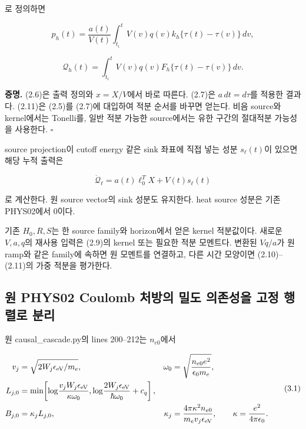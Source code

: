 \documentclass[11pt,a4paper]{article}
\begin{document}
로 정의하면

\[
p_h(t)=\frac{a(t)}{V(t)}
\int_{t_i}^{t}V(v)q(v)
k_h\{\tau(t)-\tau(v)\}\,dv,
\tag{2.10}
\]

\[
\boxed{
\mathcal Q_h(t)=
\int_{t_i}^{t}V(v)q(v)
F_h\{\tau(t)-\tau(v)\}\,dv.
}
\tag{2.11}
\]

\textbf{증명.} (2.6)은 출력 정의와 \(x=X/V\)에서 바로 따른다. (2.7)은 \(a\,dt=d\tau\)를 적용한 결과다. (2.11)은 (2.5)를 (2.7)에 대입하여 적분 순서를 바꾸면 얻는다. 비음 source와 kernel에서는 Tonelli를, 일반 적분 가능한 source에서는 유한 구간의 절대적분 가능성을 사용한다. \(\square\)

source projection이 cutoff energy 같은 sink 좌표에 직접 넣는 성분 \(s_\ell(t)\)이 있으면 해당 누적 출력은

\[
\dot{\mathcal Q}_\ell
=a(t)\ell_0^TX+V(t)s_\ell(t)
\tag{2.12}
\]

로 계산한다. 원 source vector의 sink 성분도 유지한다. heat source 성분은 기존 PHYS02에서 0이다.

기존 \(H_0,R,S\)는 한 source family와 horizon에서 얻은 kernel 적분값이다. 새로운 \(V,a,q\)의 재사용 입력은 (2.9)의 kernel 또는 필요한 적분 모멘트다. 변환된 \(Vq/a\)가 원 ramp와 같은 family에 속하면 원 모멘트를 연결하고, 다른 시간 모양이면 (2.10)--(2.11)의 가중 적분을 평가한다.

\hypertarget{uxc6d0-phys02-coulomb-uxcc98uxbc29uxc758-uxbc00uxb3c4-uxc758uxc874uxc131uxc744-uxace0uxc815-uxd589uxb82cuxb85c-uxbd84uxb9ac}{%
\subsection{원 PHYS02 Coulomb 처방의 밀도 의존성을 고정 행렬로 분리}\label{uxc6d0-phys02-coulomb-uxcc98uxbc29uxc758-uxbc00uxb3c4-uxc758uxc874uxc131uxc744-uxace0uxc815-uxd589uxb82cuxb85c-uxbd84uxb9ac}}

원 causal\_cascade.py의 lines 200--212는 \(n_{e0}\)에서

\[
\begin{aligned}
v_j&=\sqrt{2W_j\epsilon_{\rm eV}/m_e},&
\omega_0&=\sqrt{\frac{n_{e0}e^2}{\epsilon_0m_e}},\\
L_{j,0}&=\min\!\left[
\log\!\frac{v_jW_j\epsilon_{\rm eV}}{\kappa\omega_0},
\log\!\frac{2W_j\epsilon_{\rm eV}}{\hbar\omega_0}+c_q
\right],\\
B_{j,0}&=\kappa_jL_{j,0},&
\kappa_j&=\frac{4\pi\kappa^2n_{e0}}{m_ev_j\epsilon_{\rm eV}},
\qquad
\kappa=\frac{e^2}{4\pi\epsilon_0}.
\end{aligned}
\tag{3.1}
\]
\end{document}
